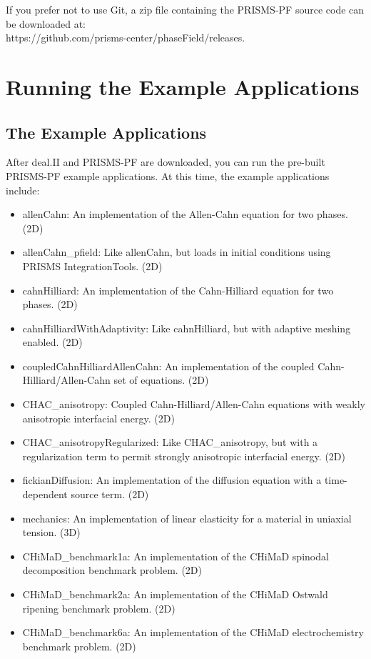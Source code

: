 \documentclass[10pt]{article} %
\begin{document}
If you prefer not to use Git, a zip file containing the PRISMS-PF source code can be downloaded at: \\https://github.com/prisms-center/phaseField/releases.

\section{Running the Example Applications} \label{running_examples}
\subsection{The Example Applications}
After deal.II and PRISMS-PF are downloaded, you can run the pre-built PRISMS-PF example applications. At this time, the example applications include:
\begin{itemize}
\item allenCahn: An implementation of the Allen-Cahn equation for two phases. (2D)
\item allenCahn\_pfield: Like allenCahn, but loads in initial conditions using PRISMS IntegrationTools. (2D)
\item cahnHilliard: An implementation of the Cahn-Hilliard equation for two phases. (2D)
\item cahnHilliardWithAdaptivity: Like cahnHilliard, but with adaptive meshing enabled. (2D)
\item coupledCahnHilliardAllenCahn: An implementation of the coupled Cahn-Hilliard/Allen-Cahn set of equations. (2D)
\item CHAC\_anisotropy: Coupled Cahn-Hilliard/Allen-Cahn equations with weakly anisotropic interfacial energy. (2D)
\item CHAC\_anisotropyRegularized: Like CHAC\_anisotropy, but with a regularization term to permit strongly anisotropic interfacial energy. (2D)
\item fickianDiffusion: An implementation of the diffusion equation with a time-dependent source term. (2D)
\item mechanics: An implementation of linear elasticity for a material in uniaxial tension. (3D)
\item CHiMaD\_benchmark1a: An implementation of the CHiMaD spinodal decomposition benchmark problem. (2D)
\item CHiMaD\_benchmark2a: An implementation of the CHiMaD Ostwald ripening benchmark problem. (2D)
\item CHiMaD\_benchmark6a: An implementation of the CHiMaD electrochemistry benchmark problem. (2D)

\end{itemize}
\end{document}
